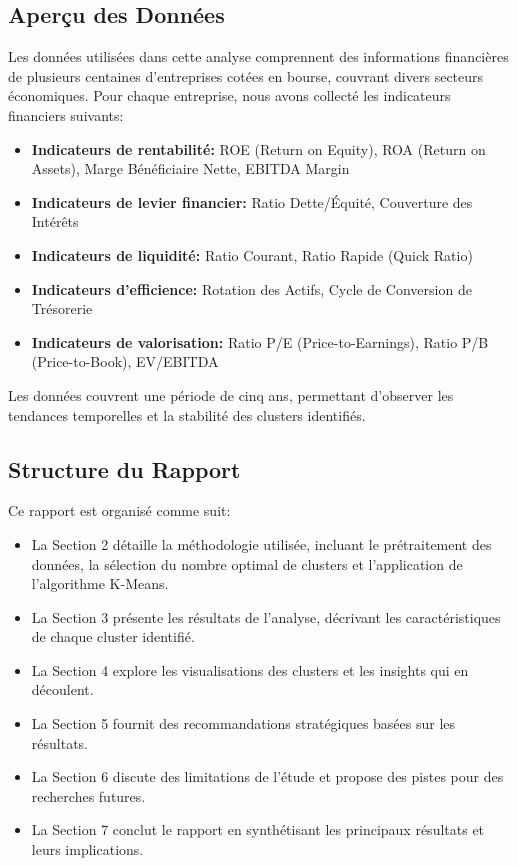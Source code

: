 \documentclass[12pt]{article}
\begin{document}
\subsection{Aperçu des Données}
Les données utilisées dans cette analyse comprennent des informations financières de plusieurs centaines d'entreprises cotées en bourse, couvrant divers secteurs économiques. Pour chaque entreprise, nous avons collecté les indicateurs financiers suivants:

\begin{itemize}
    \item \textbf{Indicateurs de rentabilité:} ROE (Return on Equity), ROA (Return on Assets), Marge Bénéficiaire Nette, EBITDA Margin
    \item \textbf{Indicateurs de levier financier:} Ratio Dette/Équité, Couverture des Intérêts
    \item \textbf{Indicateurs de liquidité:} Ratio Courant, Ratio Rapide (Quick Ratio)
    \item \textbf{Indicateurs d'efficience:} Rotation des Actifs, Cycle de Conversion de Trésorerie
    \item \textbf{Indicateurs de valorisation:} Ratio P/E (Price-to-Earnings), Ratio P/B (Price-to-Book), EV/EBITDA
\end{itemize}

Les données couvrent une période de cinq ans, permettant d'observer les tendances temporelles et la stabilité des clusters identifiés.

\subsection{Structure du Rapport}
Ce rapport est organisé comme suit:
\begin{itemize}
    \item La Section 2 détaille la méthodologie utilisée, incluant le prétraitement des données, la sélection du nombre optimal de clusters et l'application de l'algorithme K-Means.
    \item La Section 3 présente les résultats de l'analyse, décrivant les caractéristiques de chaque cluster identifié.
    \item La Section 4 explore les visualisations des clusters et les insights qui en découlent.
    \item La Section 5 fournit des recommandations stratégiques basées sur les résultats.
    \item La Section 6 discute des limitations de l'étude et propose des pistes pour des recherches futures.
    \item La Section 7 conclut le rapport en synthétisant les principaux résultats et leurs implications.
\end{itemize}
\end{document}
